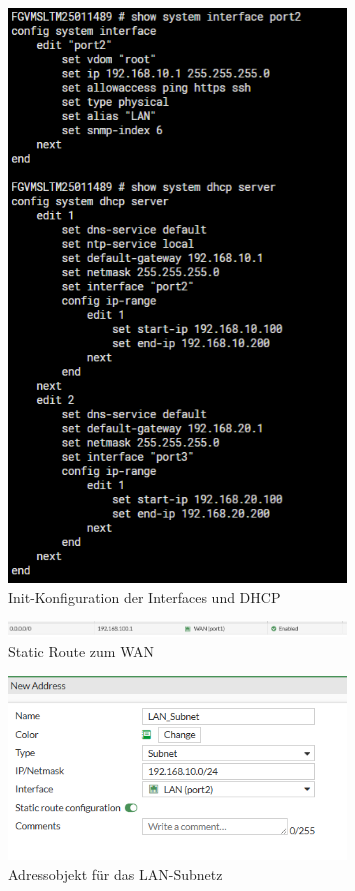 \documentclass[12pt]{scrreprt}
\begin{document}
\begin{thebibliography}{99}
\begin{figure}[htbp]
	\centering
	\includegraphics[width=0.8\textwidth]{fortivm-portconfig-init.png}
	\caption{Init-Konfiguration der Interfaces und DHCP}
	\label{fig:fortivm-config-init} %
\end{figure}

\begin{figure}[htbp]
	\centering
	\includegraphics[width=0.8\textwidth]{forti-WANroute.png}
	\caption{Static Route zum WAN}
	\label{fig:forti-WANroute} %
\end{figure}

\begin{figure}[htbp]
	\centering
	\includegraphics[width=0.8\textwidth]{forti-LAN-addr.png}
	\caption{Adressobjekt für das LAN-Subnetz}
	\label{fig:forti-LAN-addr} %
\end{figure}


\end{thebibliography}
\end{document}
